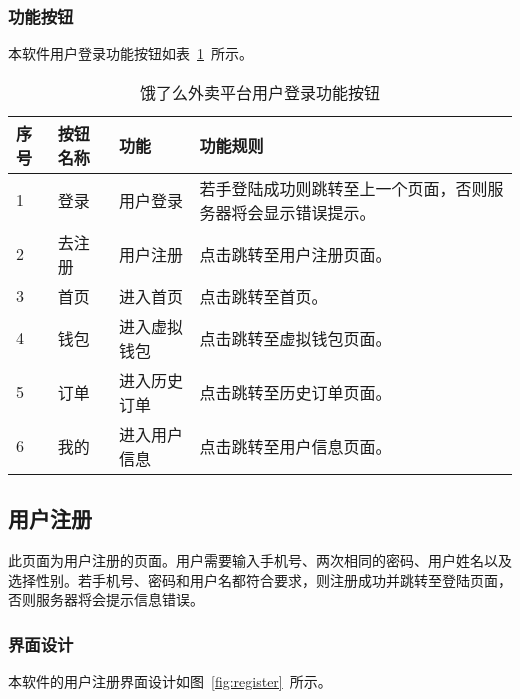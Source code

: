 \subsubsection{功能按钮}
本软件用户登录功能按钮如表~\ref{tab:table10}~所示。
\begin{table}[htbp]
    \caption{饿了么外卖平台用户登录功能按钮}\label{tab:table10}
    \vspace{0.5em}\wuhao
    \begin{tabularx}{\textwidth}{lllX}
    \toprule[1.5pt]
    序号 & 按钮名称 & 功能 & 功能规则 \\ 
    \midrule[1pt]
    1 & 登录 & 用户登录 & 若手登陆成功则跳转至上一个页面，否则服务器将会显示错误提示。 \\
    2 & 去注册 & 用户注册 & 点击跳转至用户注册页面。 \\
    3 & 首页 & 进入首页 & 点击跳转至首页。 \\
    4 & 钱包 & 进入虚拟钱包 & 点击跳转至虚拟钱包页面。 \\
    5 & 订单 & 进入历史订单 & 点击跳转至历史订单页面。 \\
    6 & 我的 & 进入用户信息 & 点击跳转至用户信息页面。 \\
\bottomrule[1.5pt]
\end{tabularx}
\vspace{\baselineskip}
\end{table}

\subsection{用户注册}
此页面为用户注册的页面。用户需要输入手机号、两次相同的密码、用户姓名以及选择性别。若手机号、密码和用户名都符合要求，则注册成功并跳转至登陆页面，否则服务器将会提示信息错误。
\subsubsection{界面设计}
本软件的用户注册界面设计如图~\ref{fig:register}~所示。
